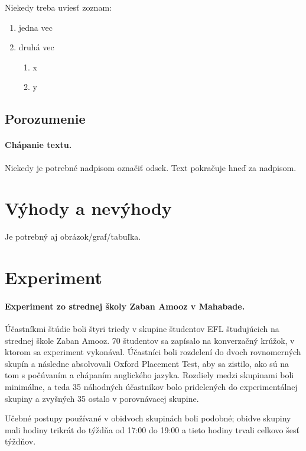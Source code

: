 \documentclass[10pt,twoside,slovak,a4paper]{article}
\begin{document}
Niekedy treba uviesť zoznam:

\begin{enumerate}
\item jedna vec
\item druhá vec
	\begin{enumerate}
	\item x
	\item y
	\end{enumerate}
\end{enumerate}


\subsection{Porozumenie} \label{mall:porozumenie}

\paragraph{Chápanie textu.}
Niekedy je potrebné nadpisom označiť odsek. Text pokračuje hneď za nadpisom.



\section{Výhody a nevýhody} \label{vyhodyanevyhody}

Je potrebný aj obrázok/graf/tabuľka.



\section{Experiment} \label{experiment}

\paragraph{Experiment zo strednej školy Zaban Amooz v Mahabade\cite{Azar2014}.} Účastníkmi štúdie boli štyri triedy v skupine študentov EFL študujúcich na strednej škole Zaban Amooz. 70 študentov sa zapísalo na konverzačný krúžok, v ktorom sa experiment vykonával. Účastníci boli rozdelení do dvoch rovnomerných skupín a následne absolvovali Oxford Placement Test, aby sa zistilo, ako sú na tom s počúvaním a chápaním anglického jazyka. Rozdiely medzi skupinami boli minimálne, a teda 35 náhodných účastníkov bolo pridelených do experimentálnej skupiny a zvyšných 35 ostalo v porovnávacej skupine.

Učebné postupy používané v obidvoch skupinách boli podobné; obidve skupiny mali hodiny trikrát do týždňa od 17:00 do 19:00 a tieto hodiny trvali celkovo šesť týždňov.
\end{document}
